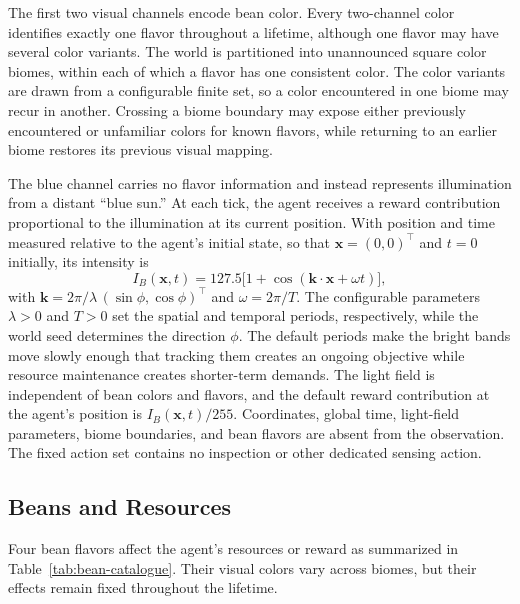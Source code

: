 \documentclass[10pt,journal,compsoc]{IEEEtran}
\begin{document}
The first two visual channels encode bean color.
Every two-channel color identifies exactly one flavor throughout a lifetime, although one flavor may have several color variants.
The world is partitioned into unannounced square color biomes, within each of which a flavor has one consistent color.
The color variants are drawn from a configurable finite set, so a color encountered in one biome may recur in another.
Crossing a biome boundary may expose either previously encountered or unfamiliar colors for known flavors, while returning to an earlier biome restores its previous visual mapping.

The blue channel carries no flavor information and instead represents illumination from a distant ``blue sun.''
At each tick, the agent receives a reward contribution proportional to the illumination at its current position.
With position and time measured relative to the agent's initial state, so that $\boldsymbol{x} = (0, 0)^{\!\top}$ and $t=0$ initially, its intensity is
\begin{equation}
    I_{\!B}(\boldsymbol{x}, t) = 127.5 \big[ 1 + \cos(\boldsymbol{k} \cdot \boldsymbol{x} + \omega t) \big],
\end{equation}
with $\boldsymbol{k} = 2\pi/\lambda \, (\sin\phi, \cos\phi)^{\!\top}$ and $\omega = 2\pi / T$.
The configurable parameters $\lambda>0$ and $T>0$ set the spatial and temporal periods, respectively, while the world seed determines the direction $\phi$.
The default periods make the bright bands move slowly enough that tracking them creates an ongoing objective while resource maintenance creates shorter-term demands.
The light field is independent of bean colors and flavors, and the default reward contribution at the agent's position is $I_{\!B}(\boldsymbol{x},t)/255$.
Coordinates, global time, light-field parameters, biome boundaries, and bean flavors are absent from the observation.
The fixed action set contains no inspection or other dedicated sensing action.

\subsection{Beans and Resources}

Four bean flavors affect the agent's resources or reward as summarized in Table~\ref{tab:bean-catalogue}.
Their visual colors vary across biomes, but their effects remain fixed throughout the lifetime.
\end{document}
